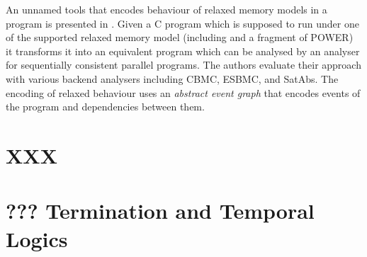 An unnamed tools that encodes behaviour of relaxed memory models in a program is presented in .
Given a C program which is supposed to run under one of the supported relaxed memory model (including \xtso and a fragment of POWER) it transforms it into an equivalent program which can be analysed by an analyser for sequentially consistent parallel programs.
The authors evaluate their approach with various backend analysers including CBMC, ESBMC, and SatAbs.
The encoding of relaxed behaviour uses an \emph{abstract event graph} that encodes events of the program and dependencies between them.





\iffalse
\section{XXX}

\section{??? Termination and Temporal Logics}

